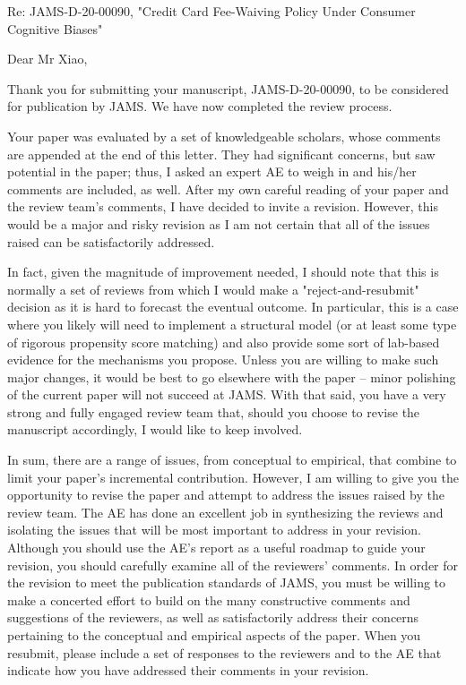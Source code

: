 

Re:  JAMS-D-20-00090, "Credit Card Fee-Waiving Policy Under Consumer Cognitive Biases"

Dear Mr Xiao,

Thank you for submitting your manuscript, JAMS-D-20-00090, to be considered for publication by JAMS. We have now completed the review process.

Your paper was evaluated by a set of knowledgeable scholars, whose comments are appended at the end of this letter. They had significant concerns, but saw potential in the paper; thus, I asked an expert AE to weigh in and his/her comments are included, as well. After my own careful reading of your paper and the review team's comments, I have decided to invite a revision. However, this would be a major and risky revision as I am not certain that all of the issues raised can be satisfactorily addressed.

In fact, given the magnitude of improvement needed, I should note that this is normally a set of reviews from which I would make a "reject-and-resubmit" decision as it is hard to forecast the eventual outcome. In particular, this is a case where you likely will need to implement a structural model (or at least some type of rigorous propensity score matching) and also provide some sort of lab-based evidence for the mechanisms you propose. Unless you are willing to make such major changes, it would be best to go elsewhere with the paper -- minor polishing of the current paper will not succeed at JAMS. With that said, you have a very strong and fully engaged review team that, should you choose to revise the manuscript accordingly, I would like to keep involved.

In sum, there are a range of issues, from conceptual to empirical, that combine to limit your paper's incremental contribution. However, I am willing to give you the opportunity to revise the paper and attempt to address the issues raised by the review team. The AE has done an excellent job in synthesizing the reviews and isolating the issues that will be most important to address in your revision. Although you should use the AE’s report as a useful roadmap to guide your revision, you should carefully examine all of the reviewers' comments. In order for the revision to meet the publication standards of JAMS, you must be willing to make a concerted effort to build on the many constructive comments and suggestions of the reviewers, as well as satisfactorily address their concerns pertaining to the conceptual and empirical aspects of the paper. When you resubmit, please include a set of responses to the reviewers and to the AE that indicate how you have addressed their comments
in your revision.


